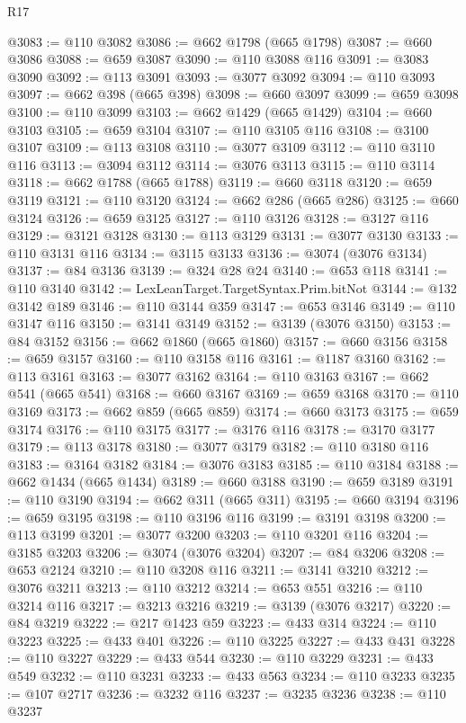 \begin{lexlean}{R17}
\begin{coremodule}
@3083 := @110 @3082
@3086 := @662 @1798 (@665 @1798)
@3087 := @660 @3086
@3088 := @659 @3087
@3090 := @110 @3088 @116
@3091 := @3083 @3090
@3092 := @113 @3091
@3093 := @3077 @3092
@3094 := @110 @3093
@3097 := @662 @398 (@665 @398)
@3098 := @660 @3097
@3099 := @659 @3098
@3100 := @110 @3099
@3103 := @662 @1429 (@665 @1429)
@3104 := @660 @3103
@3105 := @659 @3104
@3107 := @110 @3105 @116
@3108 := @3100 @3107
@3109 := @113 @3108
@3110 := @3077 @3109
@3112 := @110 @3110 @116
@3113 := @3094 @3112
@3114 := @3076 @3113
@3115 := @110 @3114
@3118 := @662 @1788 (@665 @1788)
@3119 := @660 @3118
@3120 := @659 @3119
@3121 := @110 @3120
@3124 := @662 @286 (@665 @286)
@3125 := @660 @3124
@3126 := @659 @3125
@3127 := @110 @3126
@3128 := @3127 @116
@3129 := @3121 @3128
@3130 := @113 @3129
@3131 := @3077 @3130
@3133 := @110 @3131 @116
@3134 := @3115 @3133
@3136 := @3074 (@3076 @3134)
@3137 := @84 @3136
@3139 := @324 @28 @24
@3140 := @653 @118
@3141 := @110 @3140
@3142 := LexLeanTarget.TargetSyntax.Prim.bitNot
@3144 := @132 @3142 @189
@3146 := @110 @3144 @359
@3147 := @653 @3146
@3149 := @110 @3147 @116
@3150 := @3141 @3149
@3152 := @3139 (@3076 @3150)
@3153 := @84 @3152
@3156 := @662 @1860 (@665 @1860)
@3157 := @660 @3156
@3158 := @659 @3157
@3160 := @110 @3158 @116
@3161 := @1187 @3160
@3162 := @113 @3161
@3163 := @3077 @3162
@3164 := @110 @3163
@3167 := @662 @541 (@665 @541)
@3168 := @660 @3167
@3169 := @659 @3168
@3170 := @110 @3169
@3173 := @662 @859 (@665 @859)
@3174 := @660 @3173
@3175 := @659 @3174
@3176 := @110 @3175
@3177 := @3176 @116
@3178 := @3170 @3177
@3179 := @113 @3178
@3180 := @3077 @3179
@3182 := @110 @3180 @116
@3183 := @3164 @3182
@3184 := @3076 @3183
@3185 := @110 @3184
@3188 := @662 @1434 (@665 @1434)
@3189 := @660 @3188
@3190 := @659 @3189
@3191 := @110 @3190
@3194 := @662 @311 (@665 @311)
@3195 := @660 @3194
@3196 := @659 @3195
@3198 := @110 @3196 @116
@3199 := @3191 @3198
@3200 := @113 @3199
@3201 := @3077 @3200
@3203 := @110 @3201 @116
@3204 := @3185 @3203
@3206 := @3074 (@3076 @3204)
@3207 := @84 @3206
@3208 := @653 @2124
@3210 := @110 @3208 @116
@3211 := @3141 @3210
@3212 := @3076 @3211
@3213 := @110 @3212
@3214 := @653 @551
@3216 := @110 @3214 @116
@3217 := @3213 @3216
@3219 := @3139 (@3076 @3217)
@3220 := @84 @3219
@3222 := @217 @1423 @59
@3223 := @433 @314
@3224 := @110 @3223
@3225 := @433 @401
@3226 := @110 @3225
@3227 := @433 @431
@3228 := @110 @3227
@3229 := @433 @544
@3230 := @110 @3229
@3231 := @433 @549
@3232 := @110 @3231
@3233 := @433 @563
@3234 := @110 @3233
@3235 := @107 @2717
@3236 := @3232 @116
@3237 := @3235 @3236
@3238 := @110 @3237

\end{coremodule}
\end{lexlean}
